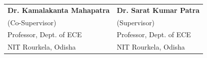\begin{table}[htbp]
  \centering
\begin{tabular}{>{\centering\arraybackslash}p{6.5cm} >{\centering\arraybackslash}p{8.5cm}}
  \textbf{Dr. Kamalakanta Mahapatra}  & \textbf{Dr. Sarat Kumar Patra}  \\
   (Co-Supervisor) & (Supervisor) \\
  Professor, Dept. of ECE &  Professor, Dept. of ECE \\
  NIT Rourkela, Odisha & NIT Rourkela, Odisha\\




  \end{tabular}%
\end{table}%